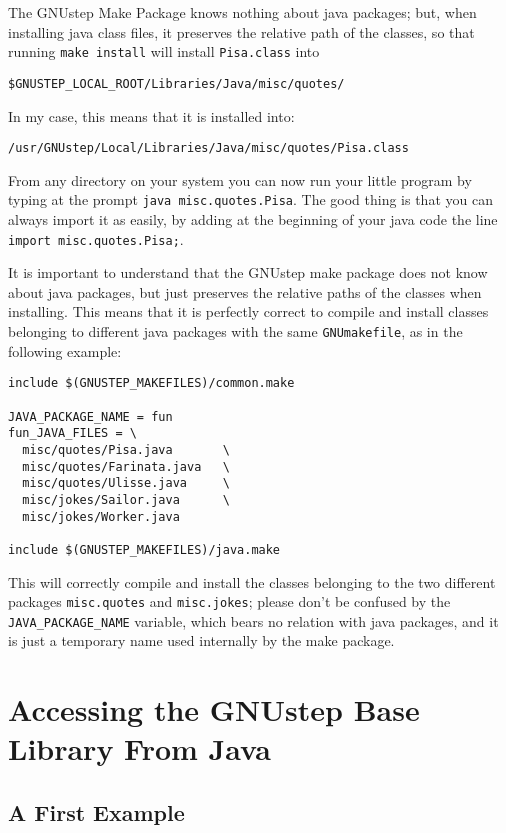 The GNUstep Make Package knows nothing about java packages; but, when
installing java class files, it preserves the relative path of the
classes, so that running \texttt{make install} will install
\texttt{Pisa.class} into
\begin{verbatim}
$GNUSTEP_LOCAL_ROOT/Libraries/Java/misc/quotes/
\end{verbatim}
In my case, this means that it is installed into:
\begin{verbatim}
/usr/GNUstep/Local/Libraries/Java/misc/quotes/Pisa.class
\end{verbatim}

From any directory on your system you can now run your little program
by typing at the prompt \texttt{java misc.quotes.Pisa}.  The good
thing is that you can always import it as easily, by adding at the
beginning of your java code the line \texttt{import
misc.quotes.Pisa;}.

It is important to understand that the GNUstep make package does not
know about java packages, but just preserves the relative paths of the
classes when installing.  This means that it is perfectly correct to
compile and install classes belonging to different java packages with
the same \texttt{GNUmakefile}, as in the following example:
\begin{verbatim}
include $(GNUSTEP_MAKEFILES)/common.make

JAVA_PACKAGE_NAME = fun
fun_JAVA_FILES = \
  misc/quotes/Pisa.java       \
  misc/quotes/Farinata.java   \
  misc/quotes/Ulisse.java     \
  misc/jokes/Sailor.java      \
  misc/jokes/Worker.java

include $(GNUSTEP_MAKEFILES)/java.make
\end{verbatim}

This will correctly compile and install the classes belonging to the
two different packages \texttt{misc.quotes} and \texttt{misc.jokes};
please don't be confused by the \texttt{JAVA\_PACKAGE\_NAME} variable,
which bears no relation with java packages, and it is just a temporary
name used internally by the make package.

\section{Accessing the GNUstep Base Library From Java}

\subsection{A First Example}

